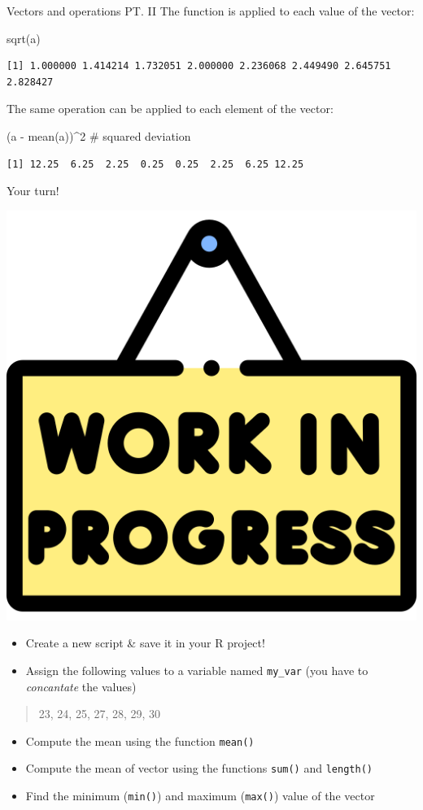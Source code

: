 \documentclass[
  ignorenonframetext,
]{beamer}
\newenvironment{Shaded}{\begin{snugshade}}{\end{snugshade}}
\newcommand{\CommentTok}[1]{\textcolor[rgb]{0.54,0.53,0.53}{#1}}
\newcommand{\DecValTok}[1]{\textcolor[rgb]{0.69,0.50,0.00}{#1}}
\newcommand{\FunctionTok}[1]{\textcolor[rgb]{0.39,0.29,0.61}{#1}}
\newcommand{\NormalTok}[1]{\textcolor[rgb]{0.12,0.11,0.11}{#1}}
\newcommand{\SpecialCharTok}[1]{\textcolor[rgb]{0.24,0.68,0.91}{#1}}
\begin{document}
\begin{frame}[fragile]{Vectors and operations PT. II}
\protect\hypertarget{vectors-and-operations-pt.-ii}{}
The function is applied to each value of the vector:

\begin{Shaded}
\begin{Highlighting}[]
\FunctionTok{sqrt}\NormalTok{(a)}
\end{Highlighting}
\end{Shaded}

\begin{verbatim}
[1] 1.000000 1.414214 1.732051 2.000000 2.236068 2.449490 2.645751 2.828427
\end{verbatim}

The same operation can be applied to each element of the vector:

\begin{Shaded}
\begin{Highlighting}[]
\NormalTok{(a }\SpecialCharTok{{-}} \FunctionTok{mean}\NormalTok{(a))}\SpecialCharTok{\^{}}\DecValTok{2} \CommentTok{\# squared deviation}
\end{Highlighting}
\end{Shaded}

\begin{verbatim}
[1] 12.25  6.25  2.25  0.25  0.25  2.25  6.25 12.25
\end{verbatim}
\end{frame}

\begin{frame}[fragile]{Your turn!}
\protect\hypertarget{your-turn-1}{}
\begin{center}\includegraphics[width=0.19\linewidth]{img/work} \end{center}

\begin{itemize}
\item
  Create a new script \& save it in your R project!
\item
  Assign the following values to a variable named \texttt{my\_var} (you
  have to \emph{concantate} the values)
\end{itemize}

\begin{quote}
23, 24, 25, 27, 28, 29, 30
\end{quote}

\begin{itemize}
\item
  Compute the mean using the function \texttt{mean()}
\item
  Compute the mean of vector using the functions \texttt{sum()} and
  \texttt{length()}
\item
  Find the minimum (\texttt{min()}) and maximum (\texttt{max()}) value
  of the vector
\end{itemize}
\end{frame}
\end{document}
